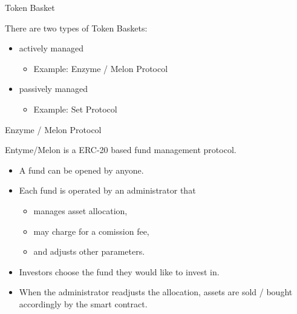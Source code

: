 \documentclass[handout]{beamer}
\begin{document}
\begin{frame}{Token Basket}
\vspace{1em}

There are two types of Token Baskets: \vspace{1em}
	
	\begin{itemize}
		\item<1-> actively managed
		\begin{itemize}
			\item<1->Example: Enzyme / Melon Protocol
		\end{itemize}
		\vspace{1em}
		\item<2-> passively managed
		\begin{itemize}
			\item<2->Example: Set Protocol
		\end{itemize}
	\end{itemize}
	
\end{frame}

\begin{frame}{Enzyme / Melon Protocol}

Entyme/Melon is a ERC-20 based fund management protocol.
\vspace{1em}

	\begin{itemize}
		\item<1-> A fund can be opened by anyone.
		\item<2-> Each fund is operated by an administrator that
	\begin{itemize}	
		\item<1-> manages asset allocation,
		\item<2-> may charge for a comission fee,
		\item<3-> and adjusts other parameters.
		
	\end{itemize}	
		\item<3-> Investors choose the fund they would like to invest in.
		\item<4-> When the administrator readjusts the allocation, assets are sold / bought accordingly by the smart contract.
	\end{itemize}
	
\end{frame}
\end{document}
